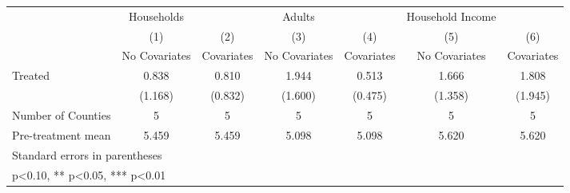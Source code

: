 {
\def\sym#1{\ifmmode^{#1}\else\(^{#1}\)\fi}
\begin{tabular}{l*{6}{c}}
\hline\hline
            &  Households   &               &      Adults   &               &Household Income   &               \\
            &\multicolumn{1}{c}{(1)}&\multicolumn{1}{c}{(2)}&\multicolumn{1}{c}{(3)}&\multicolumn{1}{c}{(4)}&\multicolumn{1}{c}{(5)}&\multicolumn{1}{c}{(6)}\\
            &\multicolumn{1}{c}{No Covariates}&\multicolumn{1}{c}{Covariates}&\multicolumn{1}{c}{No Covariates}&\multicolumn{1}{c}{Covariates}&\multicolumn{1}{c}{No Covariates}&\multicolumn{1}{c}{Covariates}\\
\hline
Treated     &       0.838   &       0.810   &       1.944   &       0.513   &       1.666   &       1.808   \\
            &     (1.168)   &     (0.832)   &     (1.600)   &     (0.475)   &     (1.358)   &     (1.945)   \\
\hline
Number of Counties&           5   &           5   &           5   &           5   &           5   &           5   \\
Pre-treatment mean&       5.459   &       5.459   &       5.098   &       5.098   &       5.620   &       5.620   \\
\hline\hline
\multicolumn{7}{l}{\footnotesize Standard errors in parentheses}\\
\multicolumn{7}{l}{\footnotesize * p<0.10, ** p<0.05, *** p<0.01}\\
\end{tabular}
}
